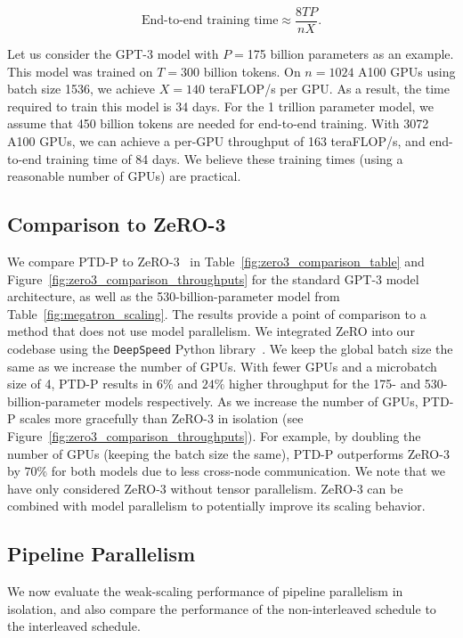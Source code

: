 \begin{equation}
\text{End-to-end training time} \approx \dfrac{8TP}{nX}.
\end{equation}

Let us consider the GPT-3 model with $P=$175 billion parameters as an example. This model was trained on $T=300$ billion tokens. On $n=1024$ A100 GPUs using batch size 1536, we achieve $X=140$ teraFLOP/s per GPU. As a result, the time required to train this model is 34 days. For the 1 trillion parameter model, we assume that 450 billion tokens are needed for end-to-end training. With 3072 A100 GPUs, we can achieve a per-GPU throughput of 163 teraFLOP/s, and end-to-end training time of 84 days. We believe these training times (using a reasonable number of GPUs) are practical.

\subsection{Comparison to ZeRO-3}

We compare PTD-P to ZeRO-3~\cite{rajbhandari2019zero,rajbhandari2021zero} in Table~\ref{fig:zero3_comparison_table} and Figure~\ref{fig:zero3_comparison_throughputs} for the standard GPT-3 model architecture, as well as the 530-billion-parameter model from Table~\ref{fig:megatron_scaling}. The results provide a point of comparison to a method that does not use model parallelism. We integrated ZeRO into our codebase using the \texttt{DeepSpeed} Python library~\cite{deepspeed}. We keep the global batch size the same as we increase the number of GPUs. With fewer GPUs and a microbatch size of 4, PTD-P results in $6\%$ and $24\%$ higher throughput for the 175- and 530-billion-parameter models respectively. As we increase the number of GPUs, PTD-P scales more gracefully than ZeRO-3 in isolation (see Figure~\ref{fig:zero3_comparison_throughputs}). For example, by doubling the number of GPUs (keeping the batch size the same), PTD-P outperforms ZeRO-3 by $70\%$ for both models due to less cross-node communication. We note that we have only considered ZeRO-3 without tensor parallelism. ZeRO-3 can be combined with model parallelism to potentially improve its scaling behavior.

\subsection{Pipeline Parallelism} We now evaluate the weak-scaling performance of pipeline parallelism in isolation, and also compare the performance of the non-interleaved schedule to the interleaved schedule.


